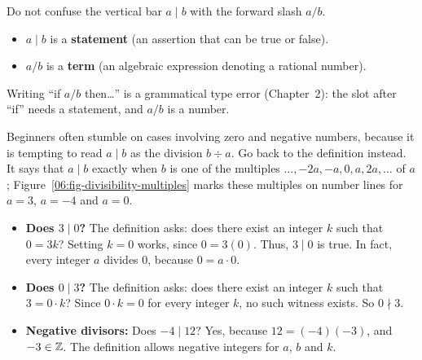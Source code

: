\begin{trapbox}
Do not confuse the vertical bar $a \mid b$ with the forward slash $a / b$.
\begin{itemize}
\item $a \mid b$ is a \textbf{statement} (an assertion that can be true or false).
\item $a / b$ is a \textbf{term} (an algebraic expression denoting a rational number).
\end{itemize}
Writing ``if $a / b$ then\ldots'' is a grammatical type error (Chapter~2): the slot after ``if'' needs a statement, and $a / b$ is a number.
\end{trapbox}

Beginners often stumble on cases involving zero and negative numbers, because it is tempting to read $a \mid b$ as the division $b \div a$. Go back to the definition instead. It says that $a \mid b$ exactly when $b$ is one of the multiples $\dots, -2a, -a, 0, a, 2a, \dots$ of $a$; Figure~\ref{06:fig-divisibility-multiples} marks these multiples on number lines for $a = 3$, $a = -4$ and $a = 0$.
\begin{itemize}
\item \textbf{Does $3 \mid 0$?} The definition asks: does there exist an integer $k$ such that $0 = 3k$? Setting $k = 0$ works, since $0 = 3(0)$. Thus, $3 \mid 0$ is true. In fact, every integer $a$ divides $0$, because $0 = a \cdot 0$.
\item \textbf{Does $0 \mid 3$?} The definition asks: does there exist an integer $k$ such that $3 = 0 \cdot k$? Since $0 \cdot k = 0$ for every integer $k$, no such witness exists. So $0 \nmid 3$.
\item \textbf{Negative divisors:} Does $-4 \mid 12$? Yes, because $12 = (-4)(-3)$, and $-3 \in \mathbb{Z}$. The definition allows negative integers for $a$, $b$ and $k$.
\end{itemize}

